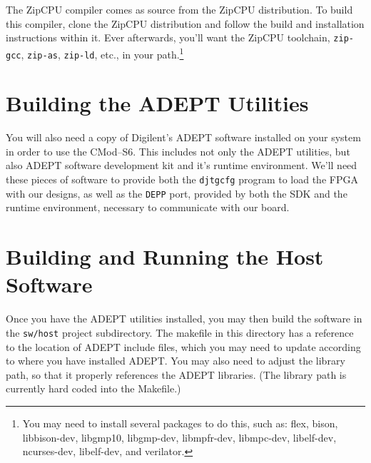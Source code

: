 \documentclass{gqtekspec}
\begin{document}
The ZipCPU compiler comes as source from the ZipCPU distribution.  To build
this compiler, clone the ZipCPU distribution and follow the build and
installation instructions within it.  Ever afterwards, you'll want the ZipCPU
toolchain, {\tt zip-gcc}, {\tt zip-as}, {\tt zip-ld}, etc., in your
path.\footnote{You may need to install several packages to do this, such as:
flex, bison, libbison-dev, libgmp10, libgmp-dev, libmpfr-dev, libmpc-dev,
libelf-dev, ncurses-dev, libelf-dev, and verilator.}



\section{Building the ADEPT Utilities}

You will also need a copy of Digilent's ADEPT software installed on your
system in order to use the CMod--S6.  This includes not only the ADEPT
utilities, but also ADEPT software development kit and it's runtime environment.
We'll need these pieces of software to provide both the {\tt djtgcfg} program
to load the FPGA with our designs, as well as the {\tt DEPP} port, provided by
both the SDK and the runtime environment, necessary to communicate with our
board.

%
\section{Building and Running the Host Software}

Once you have the ADEPT utilities installed, you may then build the software
in the {\tt sw/host} project subdirectory.  The makefile in this directory
has a reference to the location of ADEPT include files, which you may need to
update according to where you have installed ADEPT.  You may also need to
adjust the library path, so that it properly references the ADEPT libraries.
(The library path is currently hard coded into the Makefile.)
\end{document}

